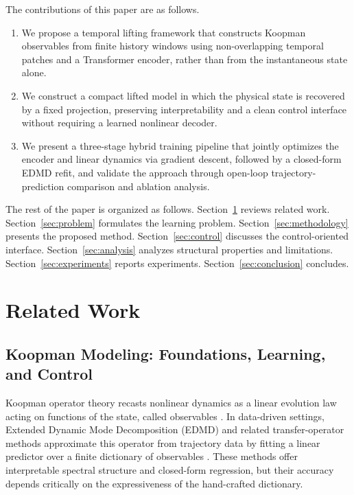 \documentclass[journal]{IEEEtran}
\begin{document}
The contributions of this paper are as follows.
\begin{enumerate}
    \item We propose a temporal lifting framework that constructs Koopman observables from finite history windows using non-overlapping temporal patches and a Transformer encoder, rather than from the instantaneous state alone.
    \item We construct a compact lifted model in which the physical state is recovered by a fixed projection, preserving interpretability and a clean control interface without requiring a learned nonlinear decoder.
    \item We present a three-stage hybrid training pipeline that jointly optimizes the encoder and linear dynamics via gradient descent, followed by a closed-form EDMD refit, and validate the approach through open-loop trajectory-prediction comparison and ablation analysis.
\end{enumerate}

The rest of the paper is organized as follows. Section~\ref{sec:related_work} reviews related work. Section~\ref{sec:problem} formulates the learning problem. Section~\ref{sec:methodology} presents the proposed method. Section~\ref{sec:control} discusses the control-oriented interface. Section~\ref{sec:analysis} analyzes structural properties and limitations. Section~\ref{sec:experiments} reports experiments. Section~\ref{sec:conclusion} concludes.

\section{Related Work}
\label{sec:related_work}

\subsection{Koopman Modeling: Foundations, Learning, and Control}

Koopman operator theory recasts nonlinear dynamics as a linear evolution law acting on functions of the state, called observables \cite{koopman1931hamiltonian, koopman1932spectra, mezic2005spectral, rowley2009spectral}. In data-driven settings, Extended Dynamic Mode Decomposition (EDMD) and related transfer-operator methods approximate this operator from trajectory data by fitting a linear predictor over a finite dictionary of observables \cite{williams2015data, williams2015kernel, klus2018data}. These methods offer interpretable spectral structure and closed-form regression, but their accuracy depends critically on the expressiveness of the hand-crafted dictionary.
\end{document}
